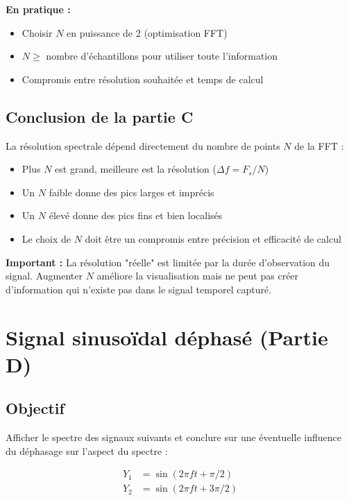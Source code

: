 \documentclass[12pt,a4paper]{article}
\begin{document}
\textbf{En pratique :}
\begin{itemize}
    \item Choisir $N$ en puissance de 2 (optimisation FFT)
    \item $N \geq$ nombre d'échantillons pour utiliser toute l'information
    \item Compromis entre résolution souhaitée et temps de calcul
\end{itemize}

\subsection{Conclusion de la partie C}

La résolution spectrale dépend directement du nombre de points $N$ de la FFT :
\begin{itemize}
    \item Plus $N$ est grand, meilleure est la résolution ($\Delta f = F_s/N$)
    \item Un $N$ faible donne des pics larges et imprécis
    \item Un $N$ élevé donne des pics fins et bien localisés
    \item Le choix de $N$ doit être un compromis entre précision et efficacité de calcul
\end{itemize}

\textbf{Important :} La résolution "réelle" est limitée par la durée d'observation du signal. Augmenter $N$ améliore la visualisation mais ne peut pas créer d'information qui n'existe pas dans le signal temporel capturé.

\newpage

\section{Signal sinusoïdal déphasé (Partie D)}

\subsection{Objectif}

Afficher le spectre des signaux suivants et conclure sur une éventuelle influence du déphasage sur l'aspect du spectre :

\begin{align}
    Y_1 &= \sin(2\pi f t + \pi/2) \\
    Y_2 &= \sin(2\pi f t + 3\pi/2)
\end{align}
\end{document}
